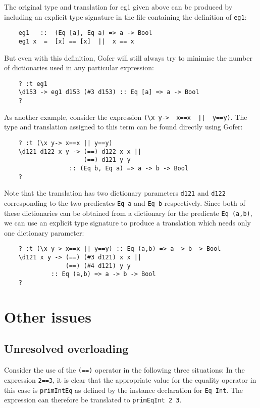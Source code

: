 The original type and translation for eg1 given above can  be  produced
by including an explicit type signature  in  the  file  containing  the
definition of \verb"eg1":
\begin{verbatim}
    eg1   ::  (Eq [a], Eq a) => a -> Bool
    eg1 x  =  [x] == [x]  ||  x == x
\end{verbatim}
But even with this definition, Gofer will still always try to  minimise
the number of dictionaries used in any particular expression:
\begin{verbatim}
    ? :t eg1
    \d153 -> eg1 d153 (#3 d153) :: Eq [a] => a -> Bool
    ?
\end{verbatim}
As another example, consider the expression \verb"(\x y->  x==x  ||  y==y)".
The type and translation assigned to this term can  be  found  directly
using Gofer:
\begin{verbatim} 
    ? :t (\x y-> x==x || y==y)
    \d121 d122 x y -> (==) d122 x x ||
                      (==) d121 y y
                  :: (Eq b, Eq a) => a -> b -> Bool
    ?
\end{verbatim}
Note that the translation has two dictionary parameters \verb"d121"  
and  \verb"d122"
corresponding to the two predicates \verb"Eq a" 
and \verb"Eq b" respectively.   Since
both of these dictionaries can be obtained from a  dictionary  for  the
predicate \verb"Eq (a,b)", we can use an explicit type signature to produce  a
translation which needs only one dictionary parameter:
\begin{verbatim}
    ? :t (\x y-> x==x || y==y) :: Eq (a,b) => a -> b -> Bool
    \d121 x y -> (==) (#3 d121) x x ||
                 (==) (#4 d121) y y
             :: Eq (a,b) => a -> b -> Bool
    ?
\end{verbatim}

\section{Other issues}

\subsection{Unresolved overloading}
Consider  the  use  of  the  \verb"(==)"  operator  in  the  following   three
situations:
\BI
\IT  In the expression \verb"2==3", it is clear that the appropriate value
     for the equality operator in this case is \verb"primIntEq" as defined  by
     the instance declaration for \verb"Eq Int".  The expression can therefore
     be translated to \verb"primEqInt 2 3".

